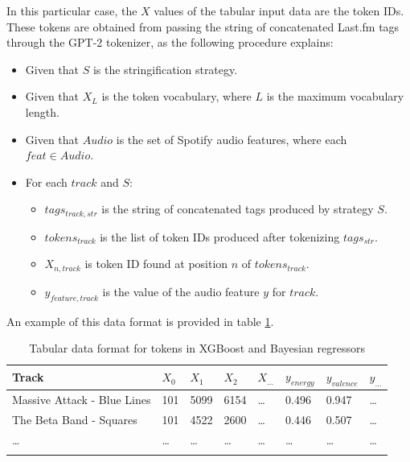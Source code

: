 \documentclass[sn-mathphys]{sn-jnl}%
\theoremstyle{thmstyleone}%
\theoremstyle{thmstyletwo}%
\theoremstyle{thmstylethree}%
\begin{document}
In this particular case, the $X$ values of the tabular input data are the token IDs.
These tokens are obtained from passing the string of concatenated Last.fm tags through the GPT-2 tokenizer,
as the following procedure explains:

\begin{itemize}
      \item Given that $S$ is the stringification strategy.
      \item Given that $X_L$ is the token vocabulary, where $L$ is the maximum vocabulary length.
      \item Given that $Audio$ is the set of Spotify audio features, where each $feat \in Audio$.
      \item For each $track$ and $S$:
      \begin{itemize}
            \item $tags_{track,str}$ is the string of concatenated tags produced by strategy $S$.
            \item $tokens_{track}$ is the list of token IDs produced after tokenizing $tags_{str}$.
            \item $X_{n,track}$ is token ID found at position $n$ of $tokens_{track}$.
            \item $y_{feature, track}$ is the value of the audio feature $y$ for $track$.
      \end{itemize}
\end{itemize}

An example of this data format is provided in table \ref{tabular_token_format}.

\begin{table}[h]
      \begin{center}
      \begin{minipage}{\textwidth}
      \caption{Tabular data format for tokens in XGBoost and Bayesian regressors}\label{tabular_token_format}%
      \begin{tabular}{@{}llllllll@{}}
      \toprule
      Track                         & $X_{0}$ & $X_{1}$ & $X_{2}$ & $X_{\dots}$ & $y_{energy}$ & $y_{valence}$ & $y_{\dots}$ \\
      \midrule
      Massive Attack - Blue Lines   & 101     & 5099    & 6154    &  \dots      & 0.496        & 0.947         &  \dots  \\
      The Beta Band - Squares       & 101     & 4522    & 2600    &  \dots      & 0.446        & 0.507         &  \dots  \\
      \dots                         & \dots   & \dots   & \dots   &  \dots      & \dots        & \dots         &  \dots  \\
      \botrule
      \end{tabular}
      \end{minipage}
      \end{center}
\end{table}
\end{document}
